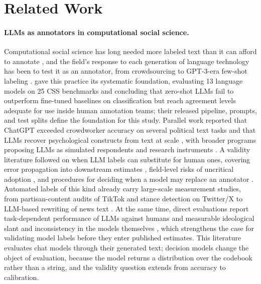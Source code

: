 \documentclass[11pt]{article}
\begin{document}
\section{Related Work}

\paragraph{LLMs as annotators in computational social science.}
Computational social science has long needed more labeled text than it can afford to annotate \citep{lazer2009computational}, and the field's response to each generation of language technology has been to test it as an annotator, from crowdsourcing \citep{snow2008cheap} to GPT-3-era few-shot labeling \citep{brown2020language, wang2021labeling, ding2023gpt3}. \citet{ziems2024llms} gave this practice its systematic foundation, evaluating 13 language models on 25 CSS benchmarks and concluding that zero-shot LLMs fail to outperform fine-tuned baselines on classification but reach agreement levels adequate for use inside human annotation teams; their released pipeline, prompts, and test splits define the foundation for this study. Parallel work reported that ChatGPT exceeded crowdworker accuracy on several political text tasks \citep{gilardi2023chatgpt, tornberg2023chatgpt} and that LLMs recover psychological constructs from text at scale \citep{rathje2024gpt}, with broader programs proposing LLMs as simulated respondents and research instruments \citep{argyle2023out, grossmann2023ai}. A validity literature followed on when LLM labels can substitute for human ones, covering error propagation into downstream estimates \citep{pangakis2023automated}, field-level risks of uncritical adoption \citep{ollion2024dangers}, and procedures for deciding when a model may replace an annotator \citep{calderon2025alternative}. Automated labels of this kind already carry large-scale measurement studies, from partisan-content audits of TikTok \citep{ibrahim2026tiktok} and stance detection on Twitter/X \citep{ibrahim2026stances} to LLM-based rewriting of news text \citep{kuo2025neutralizing}. At the same time, direct evaluations report task-dependent performance of LLMs against humans \citep{ibrahim2023perception} and measurable ideological slant and inconsistency in the models themselves \citep{aldahoul2025ideology}, which strengthens the case for validating model labels before they enter published estimates. This literature evaluates chat models through their generated text; decision models change the object of evaluation, because the model returns a distribution over the codebook rather than a string, and the validity question extends from accuracy to calibration.
\end{document}
